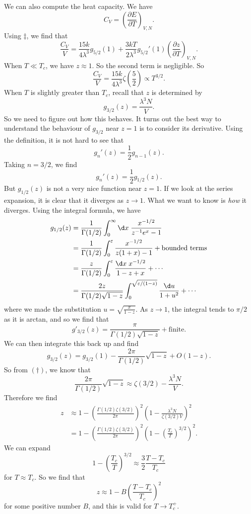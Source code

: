 \documentclass[a4paper]{article}
\begin{document}
We can also compute the heat capacity. We have
\[
  C_V = \left(\frac{\partial E}{\partial T}\right)_{V, N}.
\]
Using $\ddagger$, we find that
\[
  \frac{C_V}{V} = \frac{15k}{4 \lambda^3} g_{5/2}(1) + \frac{3kT}{2\lambda^3} g_{5/2}'(1) \left(\frac{\partial z}{\partial T}\right)_{V, N}.
\]
When $T \ll T_c$, we have $z \approx 1$. So the second term is negligible. So
\[
  \frac{C_V}{V} = \frac{15k}{4\lambda^3} \zeta\left(\frac{5}{2}\right) \propto T^{3/2}.
\]
When $T$ is slightly greater than $T_c$, recall that $z$ is determined by
\[
  g_{3/2}(z) = \frac{\lambda^3 N}{V}.
\]
So we need to figure out how this behaves. It turns out the best way to understand the behaviour of $g_{3/2}$ near $z = 1$ is to consider its derivative. Using the definition, it is not hard to see that
\[
  g_n'(z) = \frac{1}{2} g_{n - 1}(z).
\]
Taking $n = 3/2$, we find
\[
  g_n'(z) = \frac{1}{2} g_{1/2}(z).
\]
But $g_{1/2}(z)$ is not a very nice function near $z = 1$. If we look at the series expansion, it is clear that it diverges as $z \to 1$. What we want to know is \emph{how} it diverges. Using the integral formula, we have
\begin{align*}
  g_{1/2}(z) &= \frac{1}{\Gamma(1/2)} \int_0^\infty \d x\; \frac{x^{-1/2}}{z^{-1}e^x - 1} \\
  &= \frac{1}{\Gamma(1/2)} \int_0^\varepsilon \frac{x^{-1/2}}{z(1 + x) - 1} + \text{bounded terms}\\
  &= \frac{z}{\Gamma(1/2)} \int_0^\varepsilon \frac{\d x\; x^{-1/2}}{1 - z + x} + \cdots\\
  &= \frac{2z}{\Gamma(1/2)\sqrt{1 - z}} \int_0^{\sqrt{\varepsilon/(1 - z)}} \frac{\d u}{1 + u^2} + \cdots
\end{align*}
where we made the substitution $u = \sqrt{\frac{x}{1 - z}}$. As $z \to 1$, the integral tends to $\pi/2$ as it is arctan, and so we find that
\[
  g'_{3/2}(z) = \frac{\pi}{\Gamma(1/2)\sqrt{1 - z}} + \text{finite}.
\]
We can then integrate this back up and find
\[
  g_{3/2}(z) = g_{3/2}(1) - \frac{2\pi}{\Gamma(1/2)} \sqrt{1 - z} + O(1 - z).
\]
So from $(\dagger)$, we know that
\[
  \frac{2\pi}{\Gamma(1/2)} \sqrt{1 - z} \approx \zeta(3/2) - \frac{\lambda^3 N}{V}.
\]
Therefore we find
\begin{align*}
  z &\approx 1 - \left(\frac{\Gamma(1/2) \zeta(3/2)}{2\pi}\right)^2 \left(1 - \frac{\lambda^3 N}{\zeta(3/2) V}\right)^2 \\
  &= 1 - \left(\frac{\Gamma(1/2) \zeta(3/2)}{2\pi}\right)^2 \left(1 - \left(\frac{T_c}{T}\right)^{3/2}\right)^2.
\end{align*}
We can expand
\[
  1 - \left(\frac{T_c}{T}\right)^{3/2} \approx \frac{3}{2} \frac{T - T_c}{T_c}
\]
for $T \approx T_c$. So we find that
\[
  z \approx 1 - B \left(\frac{T - T_c}{T_c}\right)^2
\]
for some positive number $B$, and this is valid for $T \to T_c^+$.
\end{document}
